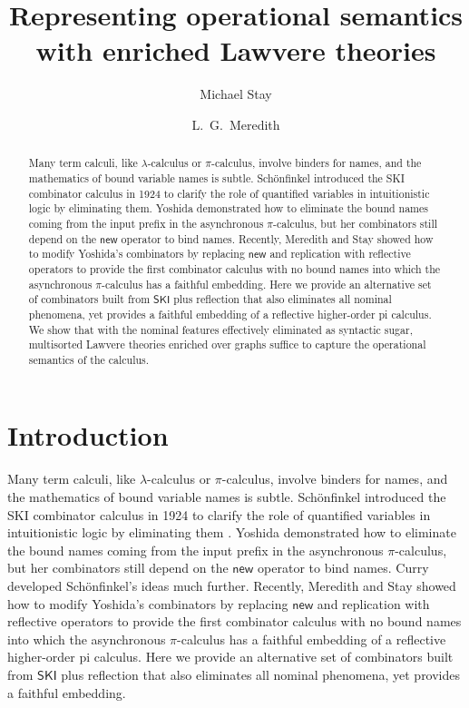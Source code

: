 \documentclass[a4paper,UKenglish]{lipics-v2016}
\title{Representing operational semantics with enriched Lawvere theories}
\author[1]{
Michael Stay
}
\author[2]{
L.\ G.\ Meredith
}
\affil[1]{
  Pyrofex Corp., Kirkland, WA, USA\\
  {\tt stay@pyrofex.net}
}
\affil[2]{
{RChain Cooperative, Seattle, WA, USA}\\
{\tt greg@rchain.coop}
}
\newcommand{\new}{\mathsf{new}}
\newcommand{\pic}{$\pi$-calculus}
\begin{document}
\maketitle
\begin{abstract}
  \noindent
  Many term calculi, like $\lambda$-calculus or {\pic}, involve
  binders for names, and the mathematics of bound variable names is
  subtle.  Sch\"onfinkel introduced the SKI combinator calculus in
  1924 to clarify the role of quantified variables in intuitionistic
  logic by eliminating them. Yoshida demonstrated how to
  eliminate the bound names coming from the input prefix in the
  asynchronous {\pic}, but her combinators still depend on the $\new$
  operator to bind names.  Recently, Meredith and Stay
  showed how to modify Yoshida's combinators by replacing $\new$ and
  replication with reflective operators to provide the first
  combinator calculus with no bound names into which the asynchronous
  {\pic} has a faithful embedding. Here we provide an alternative set
  of combinators built from $\mathsf{SKI}$ plus reflection that also
  eliminates all nominal phenomena, yet provides a faithful
  embedding  of a reflective higher-order pi calculus. 
  We show that with the nominal features effectively
  eliminated as syntactic sugar, multisorted Lawvere theories enriched
  over graphs suffice to capture the operational semantics of the
  calculus.
\end{abstract}
\EnableBpAbbreviations

\section{Introduction}
Many term calculi, like $\lambda$-calculus or {\pic}, involve binders
for names, and the mathematics of bound variable names is subtle.
Sch\"onfinkel introduced the SKI combinator calculus in 1924 to
clarify the role of quantified variables in intuitionistic logic by
eliminating them \cite{finkel}. Yoshida demonstrated how to eliminate
the bound names coming from the input prefix in the asynchronous
{\pic}, but her combinators still depend on the $\new$ operator to
bind names. Curry developed Sch\"onfinkel's ideas much
further. Recently, Meredith and Stay \cite{Rhocomb} showed how to
modify Yoshida's combinators by replacing $\new$ and replication with
reflective operators to provide the first combinator calculus with no
bound names into which the asynchronous {\pic} has a faithful
embedding of a reflective higher-order pi calculus. 
Here we provide an alternative set of combinators built
from $\mathsf{SKI}$ plus reflection that also eliminates all nominal
phenomena, yet provides a faithful embedding.
\end{document}
